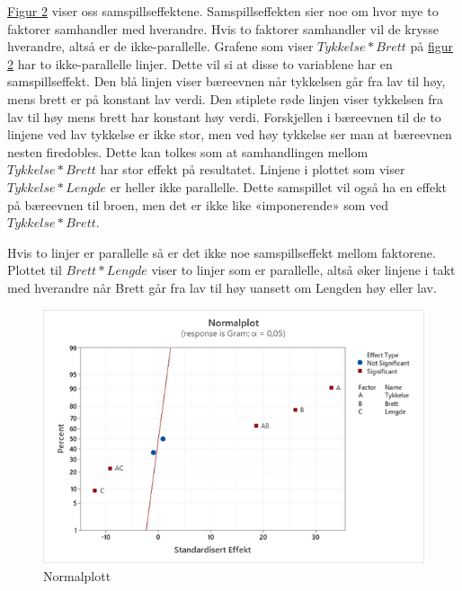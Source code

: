 \documentclass[12pt]{article}
\begin{document}
\hyperref[fig:fig2]{Figur 2} viser oss samspillseffektene. Samspillseffekten sier noe om hvor mye to faktorer samhandler med hverandre. Hvis to faktorer samhandler vil de krysse hverandre, altså er de ikke-parallelle.
Grafene som viser $Tykkelse*Brett$ på \hyperref[fig:fig2]{figur 2} har to ikke-parallelle linjer. Dette vil si at disse to variablene har en samspillseffekt. Den blå linjen viser bæreevnen når tykkelsen går fra lav til høy, mens brett er på konstant lav verdi. Den stiplete røde linjen viser tykkelsen fra lav til høy mens brett har konstant høy verdi. 
Forskjellen i bæreevnen til de to linjene ved lav tykkelse er ikke stor, men ved høy tykkelse ser man at bæreevnen nesten firedobles. Dette kan tolkes som at samhandlingen mellom $Tykkelse*Brett$ har stor effekt på resultatet. Linjene i plottet som viser $Tykkelse*Lengde$ er heller ikke parallelle. Dette samspillet vil også ha en effekt på bæreevnen til broen, men det er ikke like «imponerende» som ved $Tykkelse*Brett$.  


Hvis to linjer er parallelle så er det ikke noe samspillseffekt mellom faktorene. Plottet til $Brett*Lengde$ viser to linjer som er parallelle, altså øker linjene i takt med hverandre når Brett går fra lav til høy uansett om Lengden  høy eller lav.\cite{1}



\begin{figure}[H]
    \centering
    \includegraphics[scale=0.7]{Figur 3.png}
    \caption{Normalplott}
    \label{fig:fig3}
\end{figure}
\end{document}
